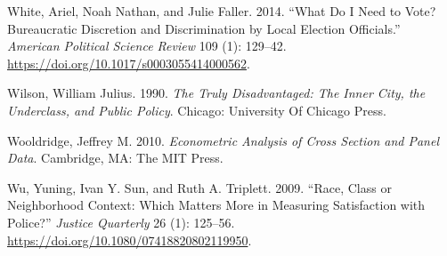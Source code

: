 \documentclass[
  12pt,
]{article}
\newlength{\cslhangindent}
\newenvironment{cslreferences}%
  {\setlength{\parindent}{0pt}%
  \everypar{\setlength{\hangindent}{\cslhangindent}}\ignorespaces}%
  {\par}
\begin{document}
\begin{cslreferences}
\leavevmode\hypertarget{ref-WHITE2014}{}%
White, Ariel, Noah Nathan, and Julie Faller. 2014. ``What Do I Need to Vote? Bureaucratic Discretion and Discrimination by Local Election Officials.'' \emph{American Political Science Review} 109 (1): 129--42. \url{https://doi.org/10.1017/s0003055414000562}.

\leavevmode\hypertarget{ref-Wilson1990}{}%
Wilson, William Julius. 1990. \emph{The Truly Disadvantaged: The Inner City, the Underclass, and Public Policy}. Chicago: University Of Chicago Press.

\leavevmode\hypertarget{ref-Wooldridge2010}{}%
Wooldridge, Jeffrey M. 2010. \emph{Econometric Analysis of Cross Section and Panel Data}. Cambridge, MA: The MIT Press.

\leavevmode\hypertarget{ref-Wu2009}{}%
Wu, Yuning, Ivan Y. Sun, and Ruth A. Triplett. 2009. ``Race, Class or Neighborhood Context: Which Matters More in Measuring Satisfaction with Police?'' \emph{Justice Quarterly} 26 (1): 125--56. \url{https://doi.org/10.1080/07418820802119950}.
\end{cslreferences}
\end{document}
